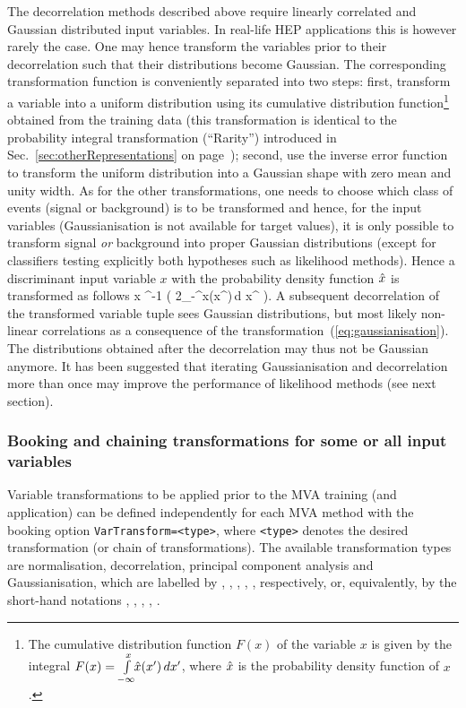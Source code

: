 The decorrelation methods described above require linearly correlated and Gaussian 
distributed input variables. In real-life HEP applications this is however rarely the 
case. One may hence transform the variables prior to their decorrelation such that their 
distributions become Gaussian. The corresponding transformation function is conveniently
separated into two steps: first, transform a variable into a uniform distribution
using its cumulative distribution function\footnote
{
   The cumulative distribution function $F(x)$ of the variable $x$ is given by 
   the integral $F(x)=\int\limits_{-\infty}^{x}\!\!\hat x(x^\prime)\,d x^\prime$, where 
   $\hat x$ is the probability density function of $x$.
} 
obtained from the training data (this transformation is identical to the probability integral transformation 
(``Rarity'') 
introduced in Sec.~\ref{sec:otherRepresentations} on page~\pageref{sec:otherRepresentations});
second, use the inverse error function to transform the uniform distribution into 
a Gaussian shape with zero mean and unity width. As for the
other transformations, one needs to choose which class of events (signal or background) is to be 
transformed and hence, for the input variables (Gaussianisation is not available 
for target values), it is only possible to transform signal {\em or} background into 
proper Gaussian distributions (except for classifiers testing explicitly both
hypotheses such as likelihood methods). Hence a discriminant input variable $x$ 
with the probability density function  $\hat x$ is transformed as follows 
\beq
\label{eq:gaussianisation}
   x \mapsto {}^{-1}\!\!
             \left( 2\cdot \!\!\intl_{-\infty}^{x}\!\!\xPDF(x^\prime)\,d x^ \right)\:.
\eeq
A subsequent decorrelation of the transformed variable tuple sees Gaussian 
distributions, but most likely non-linear correlations as a consequence of the 
transformation~(\ref{eq:gaussianisation}). The distributions obtained after the 
decorrelation may thus not be Gaussian anymore. It has been suggested that 
iterating Gaussianisation and decorrelation more than once may improve the 
performance of likelihood methods (see next section).

\subsubsection{Booking and chaining transformations for some or all input variables}

Variable transformations to be applied prior to the MVA training (and application) 
can be defined independently for each MVA method with the booking option 
{\tt VarTransform=<type>}, where {\tt <type>} denotes the desired transformation 
(or chain of transformations). The available transformation types are normalisation, 
decorrelation, principal component analysis and Gaussianisation, which are labelled by 
, , , , , respectively, or, equivalently, 
by the short-hand notations , , ,  , .

